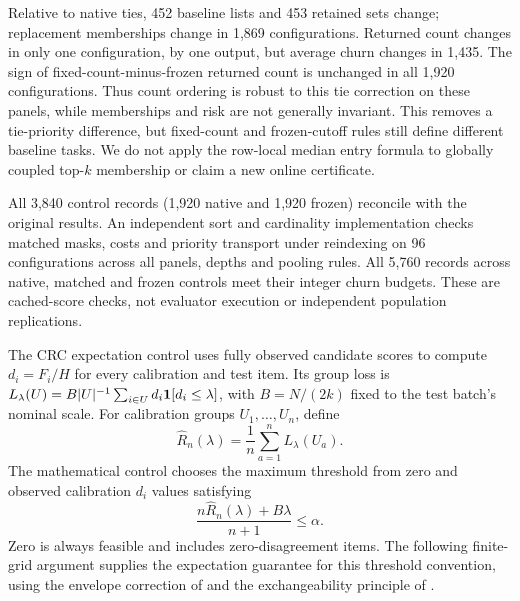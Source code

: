 Relative to native ties, 452 baseline lists and 453 retained sets change; replacement memberships change in 1,869 configurations. Returned count changes in only one configuration, by one output, but average churn changes in 1,435. The sign of fixed-count-minus-frozen returned count is unchanged in all 1,920 configurations. Thus count ordering is robust to this tie correction on these panels, while memberships and risk are not generally invariant. This removes a tie-priority difference, but fixed-count and frozen-cutoff rules still define different baseline tasks. We do not apply the row-local median entry formula to globally coupled top-$k$ membership or claim a new online certificate.

All 3,840 control records (1,920 native and 1,920 frozen) reconcile with the original results. An independent sort and cardinality implementation checks matched masks, costs and priority transport under reindexing on 96 configurations across all panels, depths and pooling rules. All 5,760 records across native, matched and frozen controls meet their integer churn budgets. These are cached-score checks, not evaluator execution or independent population replications.




The CRC expectation control uses fully observed candidate scores to compute $d_i=F_i/H$ for every calibration and test item. Its group loss is $L_\lambda(U)=B|U|^{-1}\sum_{i\in U}d_i\mathbf{1}[d_i\le\lambda]$, with $B=N/(2k)$ fixed to the test batch's nominal scale. For calibration groups $U_1,\ldots,U_n$, define
\[
 \hat R_n(\lambda)=\frac1n\sum_{a=1}^{n}L_\lambda(U_a).
\]
The mathematical control chooses the maximum threshold from zero and observed calibration $d_i$ values satisfying
\[
 \frac{n\hat R_n(\lambda)+B\lambda}{n+1}\le\alpha.
\]
Zero is always feasible and includes zero-disagreement items. The following finite-grid argument supplies the expectation guarantee for this threshold convention, using the envelope correction of \citet{yeh2025conformal} and the exchangeability principle of \citet{angelopoulos2024crc}.

